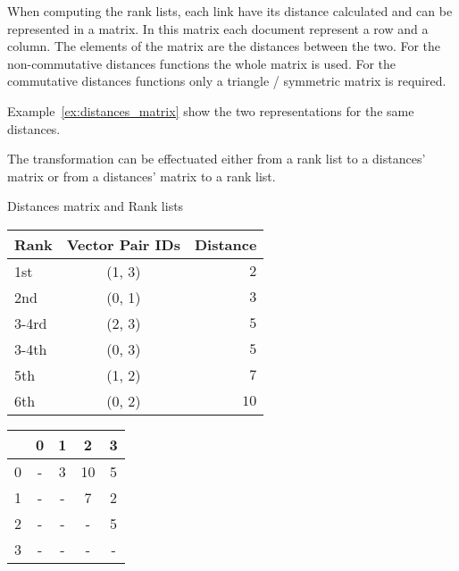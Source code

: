 When computing the rank lists, each link have its distance calculated and can be represented in a matrix.
In this matrix each document represent a row and a column.
The elements of the matrix are the distances between the two.
For the non-commutative distances functions the whole matrix is used.
For the commutative distances functions only a triangle / symmetric matrix is required.

Example~\ref{ex:distances_matrix} show the two representations for the same distances.

The transformation can be effectuated either from a rank list to a distances' matrix or from a distances' matrix to a rank list.

\begin{example}
  \centering
  \caption{Distances matrix and Rank lists}
  \label{ex:distances_matrix}
  \begin{subexample}{\linewidth}
    \centering
    \begin{tabular}{l c r}
      \toprule
      Rank & Vector Pair IDs & Distance \\
      \midrule
      1st   & (1, 3) & $2$ \\
      2nd   & (0, 1) & $3$ \\
      3-4rd & (2, 3) & $5$ \\
      3-4th & (0, 3) & $5$ \\
      5th   & (1, 2) & $7$ \\
      6th   & (0, 2) & $10$ \\
      \bottomrule
    \end{tabular}
  \end{subexample}

  \vspace{0.5cm}

  \begin{subexample}{\linewidth}
    \centering
    \begin{tabular}{c|c c c c}
      \toprule
        & 0 & 1 & 2  & 3 \\
      \midrule
      0 & - & 3 & 10 & 5 \\
      1 & - & - & 7  & 2 \\
      2 & - & - & -  & 5 \\
      3 & - & - & -  & - \\
      \bottomrule
    \end{tabular}
  \end{subexample}
\end{example}

